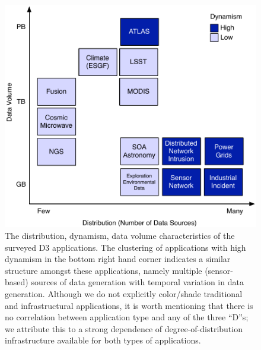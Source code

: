 \documentclass[times]{cpeauth}
\begin{document}
\begin{figure}[ht] \centering
		\includegraphics[width=.7\textwidth]{figures/application.pdf}
                \caption{The distribution, dynamism, data volume characteristics
of the surveyed D3 applications. The clustering of applications with high
dynamism in the bottom right hand corner indicates a similar structure amongst
these applications, namely multiple (sensor-based) sources of data generation
with temporal variation in data generation. Although we do not explicitly
color/shade traditional and infrastructural applications, it is worth mentioning
that there is no correlation between application type and any of the three
``D''s; we attribute this to a strong dependence of degree-of-distribution
infrastructure available for both types of applications.
                  \label{fig:figures_application}}
\end{figure}
\end{document}
